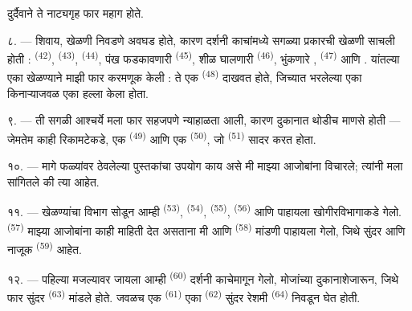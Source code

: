 दुर्दैवाने ते नाट्यगृह फार महाग होते.

८. --- शिवाय, खेळणी निवडणे अवघड होते, कारण दर्शनी काचांमध्ये सगळ्या प्रकारची खेळणी साचली होती
:  \textsuperscript{(42)},  \textsuperscript{(43)},
 \textsuperscript{(44)}, पंख फडकावणारी  \textsuperscript{(45)},
शीळ घालणारी  \textsuperscript{(46)}, भुंकणारे ,
 \textsuperscript{(47)} आणि . यांतल्या एका खेळण्याने
माझी फार करमणूक केली : ते एक  \textsuperscript{(48)} दाखवत होते, जिच्यात
 भरलेल्या एका किनाऱ्याजवळ  एका 
हल्ला केला होता.


९. --- ती सगळी आश्चर्ये मला फार सहजपणे न्याहाळता आली, कारण दुकानात थोडीच माणसे होती — जेमतेम
काही रिकामटेकडे, एक  \textsuperscript{(49)} आणि एक 
\textsuperscript{(50)}, जो  \textsuperscript{(51)}  सादर
करत होता.

१०. ---  मागे फळ्यांवर ठेवलेल्या पुस्तकांचा उपयोग काय असे मी माझ्या
आजोबांना विचारले; त्यांनी मला सांगितले की त्या  आहेत.

\VUsaut{3.6mm}
\VUsaut{2.8mm}

११. --- खेळण्यांचा विभाग सोडून आम्ही  \textsuperscript{(53)}, 
\textsuperscript{(54)},  \textsuperscript{(55)}, 
\textsuperscript{(56)} आणि  पाहायला खोगीरविभागाकडे गेलो. 
\textsuperscript{(57)} माझ्या आजोबांना काही माहिती देत असताना मी  आणि
 \textsuperscript{(58)} मांडणी पाहायला गेलो, जिथे सुंदर
 आणि नाजूक  \textsuperscript{(59)} आहेत.

१२. --- पहिल्या मजल्यावर जायला आम्ही  \textsuperscript{(60)} दर्शनी
काचेमागून गेलो, मोजांच्या दुकानाशेजारून, जिथे फार सुंदर 
\textsuperscript{(63)} मांडले होते. जवळच एक  \textsuperscript{(61)} एका
 \textsuperscript{(62)} सुंदर रेशमी 
\textsuperscript{(64)} निवडून घेत होती.

